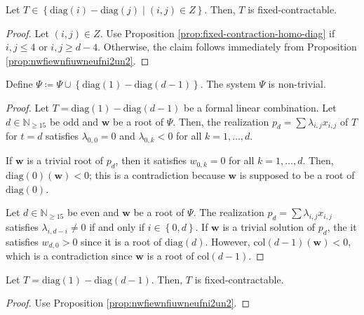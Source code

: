 \begin{proposition}
    Let \( T \in\left\{ \mathrm{diag}(i) - \mathrm{diag}(j) \mid (i,j) \in Z \right\} \). Then, \( T \) is fixed-contractable.
\end{proposition}

\begin{proof}
    Let \( (i,j) \in Z \).
    Use Proposition \ref{prop:fixed-contraction-homo-diag} if \( i,j \leq 4 \) or \( i,j \geq d-4 \). Otherwise, the claim follows immediately from Proposition \ref{prop:nwfiewnfiuwneufni2un2}.
\end{proof}

\begin{proposition}
    Define \( \Psi \coloneqq \Psi \cup \left\{ \mathrm{diag}(1) - \mathrm{diag}(d-1) \right\}\). The system \( \Psi \) is non-trivial.
\end{proposition}

\begin{proof}
    Let \( T = \mathrm{diag}(1) - \mathrm{diag}(d-1) \) be a formal linear combination. Let \( d \in \mathbb{N}_{\geq 15} \) be odd and \( \mathbf{w} \) be a root of \( \Psi \). Then, the realization \( p_d = \sum \lambda_{i,j}x_{i,j}\) of \( T \) for \( t = d \) satisfies \( \lambda_{0,0} = 0 \) and \( \lambda_{0,k} < {0} \) for all \( k = 1, \dots, d \).
    
     If \( \mathbf{w} \) is a trivial root of \( p_d \), then it satisfies \( w_{0,k} = 0 \) for all \( k = 1, \dots, d \). Then, \( \mathrm{diag}(0)(\mathbf{w}) < 0 \); this is a contradiction because \( \mathbf{w} \) is supposed to be a root of \( \mathrm{diag}(0) \).
    
    Let \( d \in \mathbb{N}_{\geq 15} \) be even and \( \mathbf{w} \) be a root of \( \Psi \). The realization \( p_d = \sum \lambda_{i,j}x_{i,j} \) satisfies \( \lambda_{i,d-i} \neq 0 \) if and only if \( i \in \left\{ 0, d \right\} \). If \( \mathbf{w} \) is a trivial solution of \( p_d \), the it satisfies \( w_{d,0} > 0 \) since it is a root of \( \mathrm{diag}(d) \). However, \( \mathrm{col}(d-1)(\mathbf{w}) < 0 \), which is a contradiction since \( \mathbf{w} \) is a root of \( \mathrm{col}(d-1) \).
\end{proof}

\begin{proposition}
    Let \( T = \mathrm{diag}(1) - \mathrm{diag}(d-1)\). Then, \( T \) is fixed-contractable.
\end{proposition}

\begin{proof}
    Use Proposition \ref{prop:nwfiewnfiuwneufni2un2}.
\end{proof}

